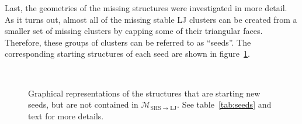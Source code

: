 Last, the geometries of the missing structures were investigated in more detail.
As it turns out, almost all of the missing stable \ac{LJ} clusters can be
created from a smaller set of missing clusters by capping some of their
triangular faces. Therefore, these groups of clusters can be referred to as
``seeds''.\autocite{Arkus_DerivingFiniteSphere_2011} The corresponding starting
structures of each seed are shown in figure~\ref{fig:seeds}.
%
\begin{figure}[htb]
    \centering
    \\
    \caption{Graphical representations of the structures that are starting new
    seeds, but are not contained in $\mathcal{M}_\mathrm{SHS\to LJ}$. See
    table~\ref{tab:seeds} and text for more details.}
    \label{fig:seeds}
\end{figure}%

